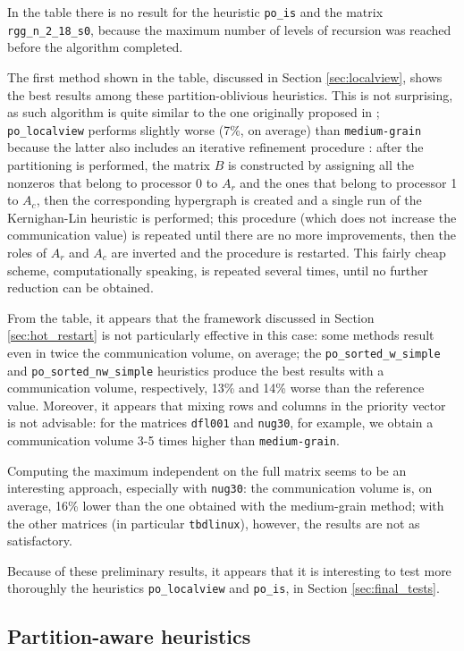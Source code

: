 In the table there is no result for the heuristic \verb|po_is| and the  matrix \verb|rgg_n_2_18_s0|, because the maximum number of levels of recursion was reached before the algorithm completed.


The first method shown in the table, discussed in Section \ref{sec:localview}, shows the best results among these partition-oblivious heuristics. This is not surprising, as such algorithm is quite similar to the one originally proposed in \cite{mediumgrain}; \verb|po_localview| performs slightly worse (7\%, on average) than \verb|medium-grain| because the latter also includes an iterative refinement procedure \cite[Section 3.3]{mediumgrain}: after the partitioning is performed, the matrix $B$ is constructed by assigning all the nonzeros that belong to processor 0 to $A_r$ and the ones that belong to processor 1 to $A_c$, then the corresponding hypergraph is created and a single run of the Kernighan-Lin heuristic is performed; this procedure (which does not increase the communication value) is repeated until there are no more improvements, then the roles of $A_r$ and $A_c$ are inverted and the procedure is restarted. This fairly cheap scheme, computationally speaking, is repeated several times, until no further reduction can be obtained. 

From the table, it appears that the framework discussed in Section \ref{sec:hot_restart} is not particularly effective in this case: some methods result even in twice the communication volume, on average; the \verb|po_sorted_w_simple| and \verb|po_sorted_nw_simple| heuristics produce the best results with a communication volume, respectively, 13\% and 14\% worse than the reference value. Moreover, it appears that mixing rows and columns in the priority vector is not advisable: for the matrices \verb|dfl001| and \verb|nug30|, for example, we obtain a communication volume 3-5 times higher than \verb|medium-grain|. 

Computing the maximum independent on the full matrix seems to be an interesting approach, especially with \verb|nug30|: the communication volume is, on average, 16\% lower than the one obtained with the medium-grain method; with the other matrices (in particular \verb|tbdlinux|), however, the results are not as satisfactory.

Because of these preliminary results, it appears that it is interesting to test more thoroughly the heuristics \verb|po_localview| and \verb|po_is|, in Section \ref{sec:final_tests}.

\subsection{Partition-aware heuristics} \label{sec:preliminary_pa}

